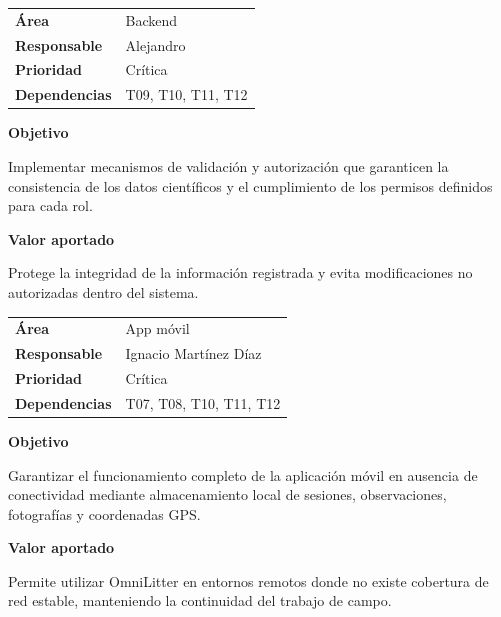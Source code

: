\begin{tcolorbox}[title=T14 -- Validación científica y permisos de observaciones,colback=gray!5,colframe=black!70,fonttitle=\bfseries]

\begin{tabularx}{\textwidth}{lX}
\textbf{Área} & Backend \\
\textbf{Responsable} & Alejandro \\
\textbf{Prioridad} & Crítica \\
\textbf{Dependencias} & T09, T10, T11, T12 \\
\end{tabularx}

\vspace{0.2cm}

\textbf{Objetivo}

Implementar mecanismos de validación y autorización que garanticen la consistencia
de los datos científicos y el cumplimiento de los permisos definidos para cada rol.

\vspace{0.15cm}

\textbf{Valor aportado}

Protege la integridad de la información registrada y evita modificaciones no
autorizadas dentro del sistema.

\end{tcolorbox}

\begin{tcolorbox}[title=T15 -- Persistencia offline del flujo de campo,colback=gray!5,colframe=black!70,fonttitle=\bfseries]

\begin{tabularx}{\textwidth}{lX}
\textbf{Área} & App móvil \\
\textbf{Responsable} & Ignacio Martínez Díaz \\
\textbf{Prioridad} & Crítica \\
\textbf{Dependencias} & T07, T08, T10, T11, T12 \\
\end{tabularx}

\vspace{0.2cm}

\textbf{Objetivo}

Garantizar el funcionamiento completo de la aplicación móvil en ausencia de
conectividad mediante almacenamiento local de sesiones, observaciones,
fotografías y coordenadas GPS.

\vspace{0.15cm}

\textbf{Valor aportado}

Permite utilizar OmniLitter en entornos remotos donde no existe cobertura de red
estable, manteniendo la continuidad del trabajo de campo.

\end{tcolorbox}

